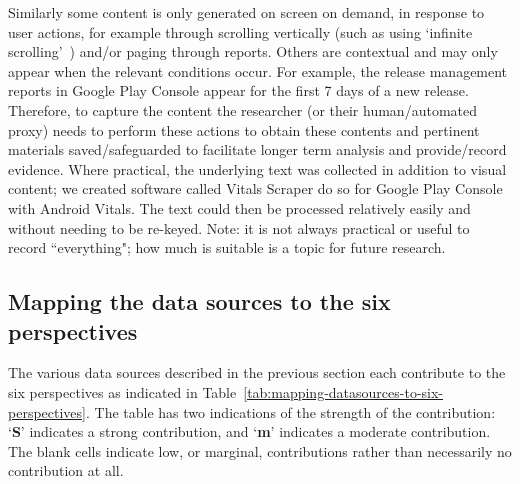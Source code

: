 Similarly some content is only generated on screen on demand, in response to user actions, for example through scrolling vertically (such as using `infinite scrolling'~\citep{parker2012_infinite_scrolling}) and/or paging through reports. Others are contextual and may only appear when the relevant conditions occur. For example, the release management reports in Google Play Console appear for the first 7 days of a new release. Therefore, to capture the content the researcher (or their human/automated proxy) needs to perform these actions to obtain these contents and pertinent materials saved/safeguarded to facilitate longer term analysis and provide/record evidence. Where practical, the underlying text was collected in addition to visual content; we created software called Vitals Scraper do so for Google Play Console with Android Vitals. The text could then be processed relatively easily and without needing to be re-keyed. Note: it is not always practical or useful to record ``everything"; how much is suitable is a topic for future research. 

\subsection{Mapping the data sources to the six perspectives}
The various data sources described in the previous section each contribute to the six perspectives as indicated in Table~\ref{tab:mapping-datasources-to-six-perspectives}. The table has two indications of the strength of the contribution: `\textbf{S}' indicates a strong contribution, and `\textbf{m}' indicates a moderate contribution. The blank cells indicate low, or marginal, contributions rather than necessarily no contribution at all.

